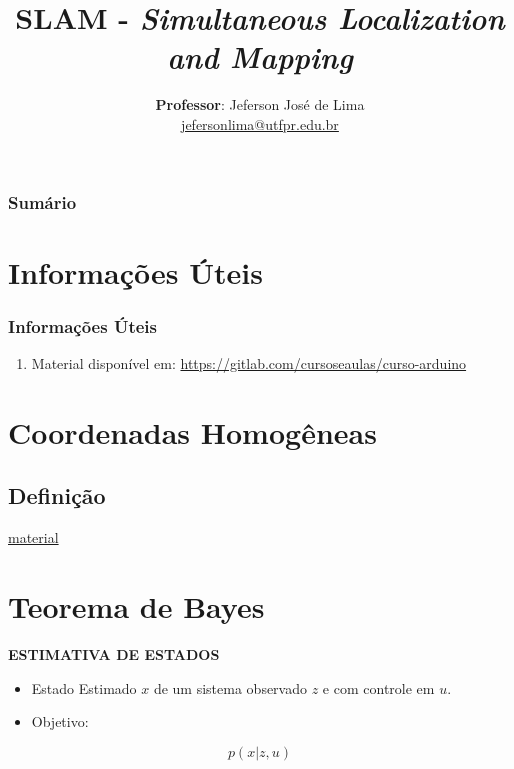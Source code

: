 \documentclass[t]{beamer}
\title[SLAM]{
  SLAM - \textit{Simultaneous Localization and Mapping}}
\author[Prof. Jeferson José de Lima]{
  \textbf{Professor}: Jeferson José de Lima\\  \medskip
  {\url{jefersonlima@utfpr.edu.br}}}
\institute[UTFPR-PB]{Departamento de Informática (DAINF-PB)}
\date[2019.2]
\newcommand{\titleSlide}[1]{\textbf{\MakeUppercase{#1}}}
\begin{document}
\begin{frame}
  \titlepage
\end{frame}

\begin{frame}
  \frametitle{Sumário}
  {\small {\small \tableofcontents}}
\end{frame}


\section{Informações Úteis}
  \frametitle{Informações Úteis}
\begin{frame}

\begin{enumerate}
\item Material disponível em: \href{https://gitlab.com/cursoseaulas/curso-arduino}{https://gitlab.com/cursoseaulas/curso-arduino} 
\end{enumerate}

\end{frame}


\section{Coordenadas Homogêneas}
\subsection{Definição}
\begin{frame}
  \href{http://www.joinville.ifsc.edu.br/~michael.klug/ROB74/Aulas/aula2_trans_geometricas.pdf
  }{material}
\end{frame}
\section{Teorema de Bayes}
\begin{frame}
  \titleSlide{Estimativa de Estados}

  \begin{itemize}
    \item Estado Estimado $x$ de um sistema observado $z$ e com controle em $u$.
    \item Objetivo:
  \end{itemize}

  \begin{equation}
    p(x|z,u)
  \end{equation}

\end{frame}
\end{document}
